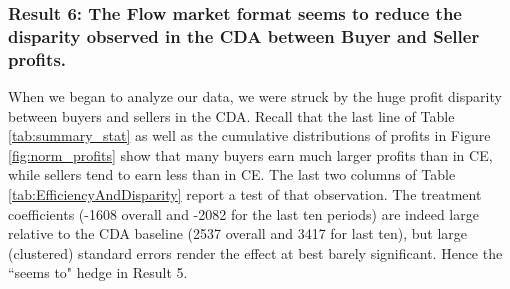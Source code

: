 \documentclass[12pt]{article}
\begin{document}
\subsubsection*{Result 6: The Flow market format seems to reduce the disparity observed in the CDA between Buyer and Seller profits.}

When we began to analyze our data, we were struck by the huge profit disparity between buyers and sellers
in the CDA. Recall that the last line of Table \ref{tab:summary_stat} as well as the cumulative distributions of profits in Figure \ref{fig:norm_profits} show that many buyers earn much larger profits than in CE, while sellers tend to earn less than in CE. 
The last two columns of Table \ref{tab:EfficiencyAndDisparity} report a test of that observation.
The treatment coefficients (-1608 overall and -2082 for the last ten periods) are indeed large relative to the CDA baseline (2537 overall and 3417 for last ten), but large (clustered) standard errors render the effect at best barely significant. Hence the ``seems to" 
hedge in Result 5.
\end{document}
